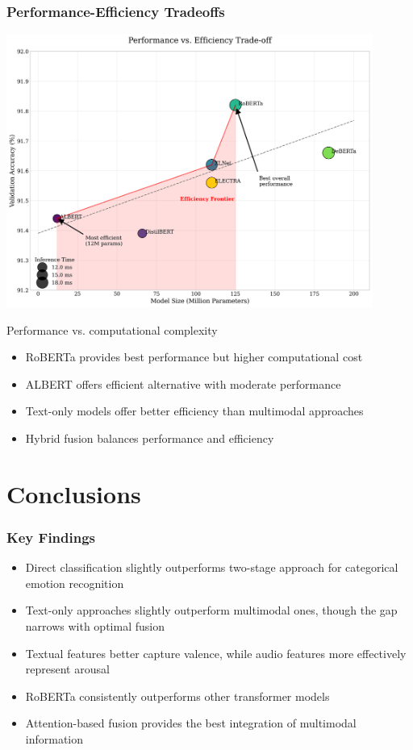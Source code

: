 \documentclass{beamer}
\begin{document}
\begin{frame}
\frametitle{Performance-Efficiency Tradeoffs}
\begin{center}
\includegraphics[width=0.9\textwidth]{figures/performance_efficiency.png}
\caption{Performance vs. computational complexity}
\end{center}

\begin{itemize}
    \item RoBERTa provides best performance but higher computational cost
    \item ALBERT offers efficient alternative with moderate performance
    \item Text-only models offer better efficiency than multimodal approaches
    \item Hybrid fusion balances performance and efficiency
\end{itemize}
\end{frame}

\section{Conclusions}

\begin{frame}
\frametitle{Key Findings}
\begin{itemize}
    \item Direct classification slightly outperforms two-stage approach for categorical emotion recognition
    \item Text-only approaches slightly outperform multimodal ones, though the gap narrows with optimal fusion
    \item Textual features better capture valence, while audio features more effectively represent arousal
    \item RoBERTa consistently outperforms other transformer models
    \item Attention-based fusion provides the best integration of multimodal information
\end{itemize}
\end{frame}
\end{document}
